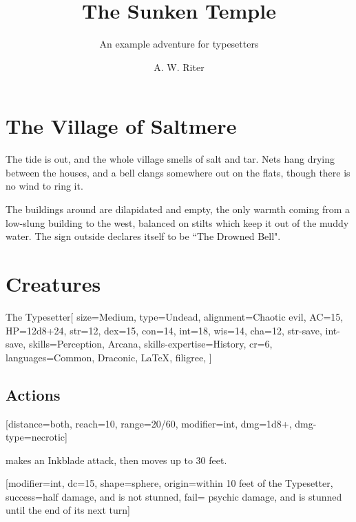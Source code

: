 \documentclass[theme=dnd]{rpgbook}
\title{The Sunken Temple}
\subtitle{An example adventure for typesetters}
\author{A. W. Riter}
\begin{document}
	\maketitle



	\chapter{The Village of Saltmere}

		\begin{RpgNarration}
			The tide is out, and the whole village smells of salt and tar. Nets hang drying between the houses, and a bell clangs somewhere out on the flats, though there is no wind to ring it.

			The buildings around are dilapidated and empty, the only warmth coming from a low-slung building to the west, balanced on stilts which keep it out of the muddy water. The sign outside declares itself to be ``The Drowned Bell".
		\end{RpgNarration}
		
		\appendix

	\chapter{Creatures}

		\begin{RpgStat*}{The Typesetter}[
				size=Medium,
				type=Undead,
				alignment={Chaotic evil},
				AC=15,
				HP=12d8+24,
				str=12, dex=15, con=14, int=18, wis=14, cha=12,
				str-save, int-save,
				skills={Perception, Arcana},
				skills-expertise=History,
				cr=6,
				languages={Common, Draconic, \LaTeX},
				filigree,
			]

			\begin{RpgStatSpells}[title={Drowned Spellcasting}, innate, modifier=int]
			\end{RpgStatSpells}

			\section{Actions}
				[distance=both, reach=10, range=20/60, modifier=int, dmg=1d8+, dmg-type=necrotic]

				\RpgStatLegendarySection[uses=2]
				 \name{} makes an Inkblade attack, then moves up to 30 feet.

				\RpgStatMythicSection[narration={Just as the Typesetter falls, a voice rings out: \textit{``but will it compile on Overleaf?''} The ink on the walls begins to move\ldots}]
				[modifier=int, dc=15, shape=sphere, origin={within 10 feet of the Typesetter}, success={half damage, and is not stunned}, fail={ psychic damage, and is stunned until the end of its next turn}]
		\end{RpgStat*}
\end{document}
